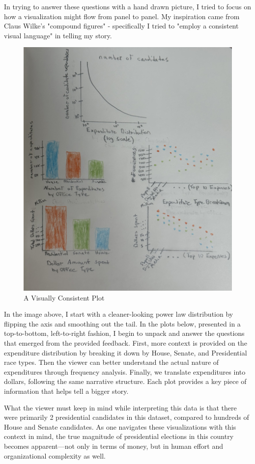 \documentclass[12pt]{article}
\begin{document}
In trying to answer these questions with a hand drawn picture, I tried to focus on how a visualization might flow from panel to panel. My inspiration came from Claus Wilke's "compound figures" - specifically I tried to "employ a consistent visual language" in telling my story.

\begin{figure}[htbp]
    \centering
    \includegraphics[width=0.8\linewidth]{DS_HW3_hand_drawn.jpeg}
    \caption{A Visually Consistent Plot}
    \label{fig:myfigure}
\end{figure}

In the image above, I start with a cleaner-looking power law distribution by flipping the axis and smoothing out the tail. In the plots below, presented in a top-to-bottom, left-to-right fashion, I begin to unpack and answer the questions that emerged from the provided feedback. First, more context is provided on the expenditure distribution by breaking it down by House, Senate, and Presidential race types. Then the viewer can better understand the actual nature of expenditures through frequency analysis. Finally, we translate expenditures into dollars, following the same narrative structure. Each plot provides a key piece of information that helps tell a bigger story.

What the viewer must keep in mind while interpreting this data is that there were primarily 2 presidential candidates in this dataset, compared to hundreds of House and Senate candidates. As one navigates these visualizations with this context in mind, the true magnitude of presidential elections in this country becomes apparent—not only in terms of money, but in human effort and organizational complexity as well.
\end{document}
